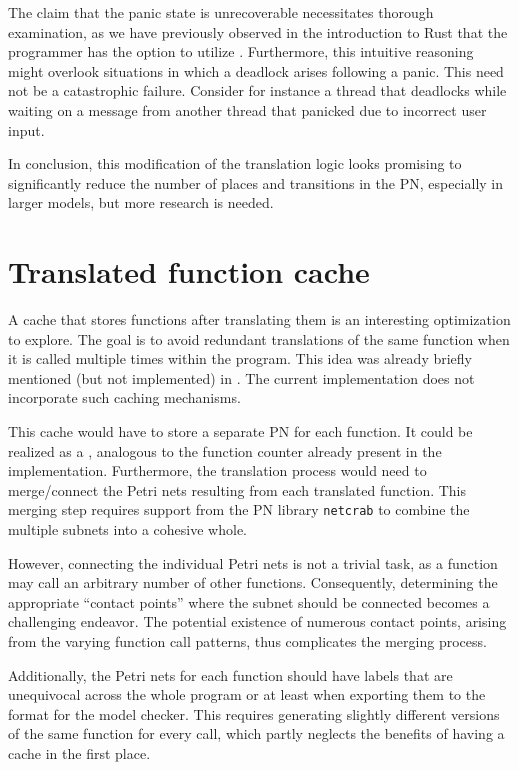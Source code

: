 The claim that the panic state is unrecoverable necessitates thorough examination,
as we have previously observed in the introduction to Rust
that the programmer has the option to utilize .
Furthermore, this intuitive reasoning might overlook situations
in which a deadlock arises following a panic.
This need not be a catastrophic failure.
Consider for instance a thread that deadlocks while waiting on a message
from another thread that panicked due to incorrect user input.

In conclusion, this modification of the translation logic looks promising
to significantly reduce the number of places and transitions in the \acrshort{PN},
especially in larger models, but more research is needed.

\section{Translated function cache}
\label{sec:future-work-function-cache}

A cache that stores functions after translating them is
an interesting optimization to explore.
The goal is to avoid redundant translations of the same function
when it is called multiple times within the program.
This idea was already briefly mentioned (but not implemented) in \cite{meyer2020}.
The current implementation does not incorporate such caching mechanisms.

This cache would have to store a separate \acrshort{PN} for each function.
It could be realized as a ,
analogous to the function counter already present in the implementation.
Furthermore, the translation process would need to merge/connect
the Petri nets resulting from each translated function.
This merging step requires support from the \acrshort{PN} library \texttt{netcrab}
to combine the multiple subnets into a cohesive whole.

However, connecting the individual Petri nets is not a trivial task,
as a function may call an arbitrary number of other functions.
Consequently, determining the appropriate ``contact points''
where the subnet should be connected becomes a challenging endeavor.
The potential existence of numerous contact points,
arising from the varying function call patterns, thus complicates the merging process.

Additionally, the Petri nets for each function should have labels that are unequivocal
across the whole program or at least when exporting them to the format for the model checker.
This requires generating slightly different versions of the same function for every call,
which partly neglects the benefits of having a cache in the first place.

